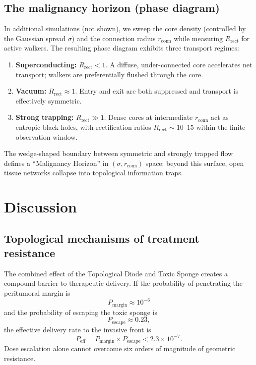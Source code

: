 \documentclass[aps,pre,twocolumn,superscriptaddress,10pt,floatfix]{revtex4-2}
\begin{document}
\subsection{The malignancy horizon (phase diagram)}

In additional simulations (not shown), we sweep the core density (controlled by the Gaussian spread $\sigma$) and the connection radius $r_{\mathrm{conn}}$ while measuring $R_{\mathrm{rect}}$ for active walkers. The resulting phase diagram exhibits three transport regimes:

\begin{enumerate}
  \item \textbf{Superconducting:} $R_{\mathrm{rect}} < 1$. A diffuse, under-connected core accelerates net transport; walkers are preferentially flushed through the core.
  \item \textbf{Vacuum:} $R_{\mathrm{rect}} \approx 1$. Entry and exit are both suppressed and transport is effectively symmetric.
  \item \textbf{Strong trapping:} $R_{\mathrm{rect}} \gg 1$. Dense cores at intermediate $r_{\mathrm{conn}}$ act as entropic black holes, with rectification ratios $R_{\mathrm{rect}} \sim 10$--$15$ within the finite observation window.
\end{enumerate}

The wedge-shaped boundary between symmetric and strongly trapped flow defines a ``Malignancy Horizon'' in $(\sigma, r_{\mathrm{conn}})$ space: beyond this surface, open tissue networks collapse into topological information traps.

\section{Discussion}

\subsection{Topological mechanisms of treatment resistance}

The combined effect of the Topological Diode and Toxic Sponge creates a compound barrier to therapeutic delivery. If the probability of penetrating the peritumoral margin is
\begin{equation}
  P_{\mathrm{margin}} \approx 10^{-6}
\end{equation}
and the probability of escaping the toxic sponge is
\begin{equation}
  P_{\mathrm{escape}} \approx 0.23,
\end{equation}
the effective delivery rate to the invasive front is
\begin{equation}
  P_{\mathrm{eff}} = P_{\mathrm{margin}} \times P_{\mathrm{escape}}
  < 2.3 \times 10^{-7}.
  \label{eq:Peff}
\end{equation}
Dose escalation alone cannot overcome six orders of magnitude of geometric resistance.
\end{document}
